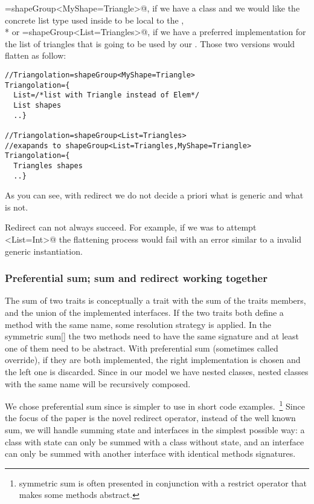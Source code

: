 \Q@Triangolation=shapeGroup<MyShape=Triangle>@,
if we have a \Q@Triangle@ class and we would like the concrete list type
used inside to be local to the \Q@Triangolation@,\\*
or 
\Q@Triangolation=shapeGroup<List=Triangles>@,
if we have a preferred implementation for the list of triangles that is going to be used by our
\Q@Triangolation@.
Those two versions would flatten as follow:
\begin{lstlisting}
//Triangolation=shapeGroup<MyShape=Triangle>
Triangolation={
  List=/*list with Triangle instead of Elem*/
  List shapes
  ..}

//Triangolation=shapeGroup<List=Triangles>
//exapands to shapeGroup<List=Triangles,MyShape=Triangle>
Triangolation={
  Triangles shapes
  ..}
\end{lstlisting}
As you can see, with redirect we do not decide a priori what is generic and what is not.

Redirect can not always succeed. For example, if we was to attempt
\Q@shapeGroup<List=Int>@ the flattening process would fail with an error similar to a 
invalid generic instantiation.

\subsubsection{Preferential sum; sum and redirect working together}
The sum of two traits is conceptually a trait with the sum of the traits members, and the union of the implemented interfaces.
If the two traits both define a method with the same name, some resolution strategy is applied.
In the symmetric sum[] the two methods need to have the same signature and at least one of them need to be abstract.
With preferential sum (sometimes called override), if they are both implemented, the right implementation is chosen and the left one is discarded.
Since in our model we have nested classes, nested classes with the same name will be recursively composed.

We chose preferential sum since is simpler to use in short code examples.~\footnote{symmetric sum is often presented in conjunction with a restrict operator that makes some methods abstract.}
Since the focus of the paper is the novel redirect operator, instead of the well known sum, we will handle summing state and interfaces in the simplest possible way:
a class with state can only be summed with a class without state, and an interface can only be summed with another interface with identical methods signatures.


